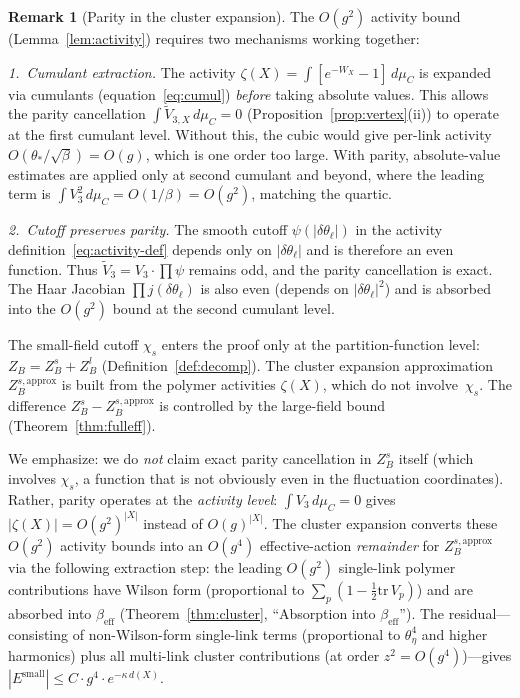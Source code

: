 \documentclass[11pt]{article}
\theoremstyle{definition}
\newtheorem{remark}[theorem]{Remark}
\newcommand{\tr}{\mathrm{tr}}
\begin{document}
\begin{remark}[Parity in the cluster expansion]%
\label{rem:parity-cluster}
The $O(g^2)$ activity bound (Lemma~\ref{lem:activity}) requires
two mechanisms working together:

\emph{1.~Cumulant extraction.}
The activity $\zeta(X)=\int[e^{-W_X}-1]\,d\mu_C$ is expanded
via cumulants (equation~\eqref{eq:cumul}) \emph{before} taking
absolute values.  This allows the parity cancellation
$\int\widetilde{V}_{3,X}\,d\mu_C=0$
(Proposition~\ref{prop:vertex}(ii)) to operate at the first
cumulant level.  Without this, the cubic would give per-link
activity $O(\theta_*/\sqrt{\beta})=O(g)$, which is one order
too large.  With parity, absolute-value estimates are applied only
at second cumulant and beyond, where the leading term is
$\int V_3^2\,d\mu_C=O(1/\beta)=O(g^2)$, matching the quartic.

\emph{2.~Cutoff preserves parity.}
The smooth cutoff $\psi(|\delta\theta_\ell|)$ in the activity
definition~\eqref{eq:activity-def} depends only on
$|\delta\theta_\ell|$ and is therefore an even function.  Thus
$\widetilde{V}_3=V_3\cdot\prod\psi$ remains odd, and the parity
cancellation is exact.  The Haar Jacobian
$\prod j(\delta\theta_\ell)$ is also even (depends on
$|\delta\theta_\ell|^2$) and is absorbed into the $O(g^2)$ bound
at the second cumulant level.

The small-field cutoff $\chi_s$ enters the proof only at the
partition-function level: $Z_B=Z_B^s+Z_B^l$
(Definition~\ref{def:decomp}).  The cluster expansion approximation
$Z_B^{s,\mathrm{approx}}$ is built from the polymer activities
$\zeta(X)$, which do not involve~$\chi_s$.  The difference
$Z_B^s-Z_B^{s,\mathrm{approx}}$ is controlled by the large-field
bound (Theorem~\ref{thm:fulleff}).

We emphasize: we do \emph{not} claim exact parity cancellation in
$Z_B^s$ itself (which involves $\chi_s$, a function that is
not obviously even in the fluctuation coordinates).  Rather,
parity operates at the \emph{activity level}: $\int V_3\,d\mu_C=0$
gives $|\zeta(X)|=O(g^2)^{|X|}$ instead of $O(g)^{|X|}$.
The cluster expansion converts these $O(g^2)$ activity bounds into
an $O(g^4)$ effective-action \emph{remainder} for
$Z_B^{s,\mathrm{approx}}$ via the following extraction step:
the leading $O(g^2)$ single-link polymer contributions have
Wilson form (proportional to $\sum_p(1-\frac{1}{2}\tr\,V_p)$) and
are absorbed into $\beta_{\mathrm{eff}}$
(Theorem~\ref{thm:cluster}, ``Absorption into $\beta_{\mathrm{eff}}$'').
The residual---consisting of non-Wilson-form single-link terms
(proportional to $\theta_\eta^4$ and higher harmonics) plus all
multi-link cluster contributions (at order $z^2=O(g^4)$)---gives
$|E^{\mathrm{small}}|\le C\cdot g^4\cdot e^{-\kappa\,d(X)}$.


\end{remark}
\end{document}
